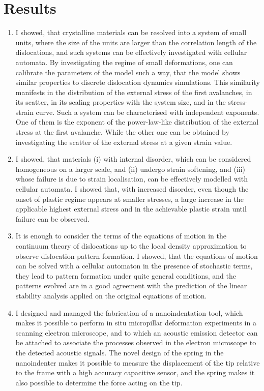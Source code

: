 \documentclass[a5paper,twoside,10pt]{article}
\begin{document}
\section*{Results}
\begin{enumerate}
\item I showed, that crystalline materials can be resolved into a system of small units, where the size of the units are larger than the correlation length of the dislocations, and such systems can be effectively investigated with cellular automata. By investigating the regime of small deformations, one can calibrate the parameters of the model such a way, that the model shows similar properties to discrete dislocation dynamics simulations. This similarity manifests in the distribution of the external stress of the first avalanches, in its scatter, in its scaling properties with the system size, and in the stress-strain curve. Such a system can be characterised with independent exponents. One of them is the exponent of the power-law-like distribution of the external stress at the first avalanche. While the other one can be obtained by investigating the scatter of the external stress at a given strain value.  \cite{PhysRevB.95.054108}

\item I showed, that materials (i) with internal disorder, which can be considered homogeneous on a larger scale, and (ii) undergo strain softening, and (iii) whose failure is due to strain localisation, can be effectively modelled with cellular automata. I showed that, with increased disorder, even though the onset of plastic regime appears at smaller stresses, a large increase in the applicable highest external stress and in the achievable plastic strain until failure can be observed. \cite{Tuzes2017}

\item It is enough to consider the terms of the equations of motion in the continuum theory of dislocations up to the local density approximation to observe dislocation pattern formation. I showed, that the equations of motion can be solved with a cellular automaton in the presence of stochastic terms, they lead to pattern formation under quite general conditions, and the patterns evolved are in a good agreement with the prediction of the linear stability analysis applied on the original equations of motion.  \cite{PhysRevB.98.054110}

\item I designed and managed the fabrication of a nanoindentation tool, which makes it possible to perform in situ micropillar deformation experiments in a scanning electron microscope, and to which an acoustic emission detector can be attached to associate the processes observed in the electron microscope to the detected acoustic signals. The novel design of the spring in the nanoindenter makes it possible to measure the displacement of the tip relative to the frame with a high accuracy capacitive sensor, and the spring makes it also possible to determine the force acting on the tip. \cite{hegyi}
\end{enumerate}
\end{document}
